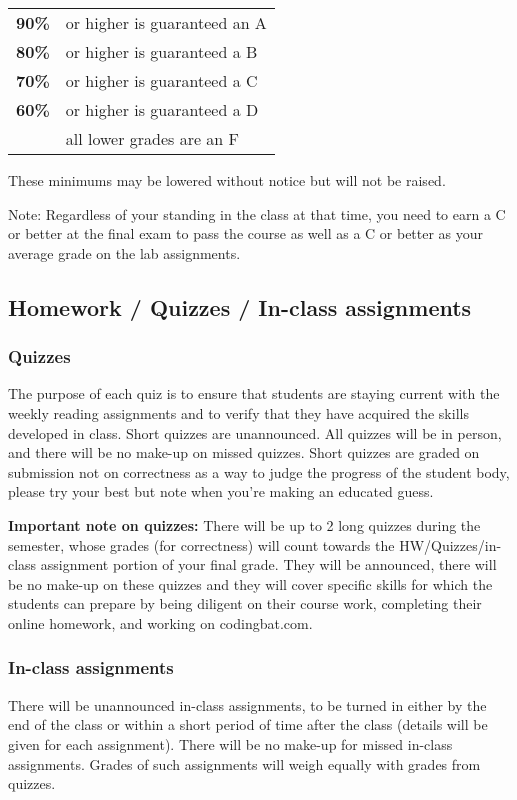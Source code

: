 \documentclass[12pt]{scrartcl}
\begin{document}
\begin{center}
\begin{tabular}{rl}
\textbf{90\%}& or higher is guaranteed an A \\
\textbf{80\%}& or higher is guaranteed a B \\
\textbf{70\%}& or higher is guaranteed a C \\
\textbf{60\%}& or higher is guaranteed a D \\
\textbf{}& all lower grades are an F 
\end{tabular}
\end{center}
These minimums may be lowered without notice but will not be raised. 

Note: Regardless of your standing in the class at that time, you need to earn a C or better at the final exam to pass the course as well as a C or better as your average grade on the lab assignments. 

\subsection{Homework / Quizzes / In-class assignments}

\subsubsection{Quizzes}
The purpose of each quiz is to ensure that students are staying current with the weekly reading assignments and to verify that they have acquired the skills developed in class. 
Short quizzes are unannounced. 
All quizzes will be in person, 
and there will be no make-up on missed quizzes.
Short quizzes are graded on submission not on correctness as a way to judge the progress of the student body, please try your best but note when you're making an educated guess. 

\textbf{Important note on quizzes:} 
There will be up to 2 long quizzes during the semester, whose grades (for correctness) will count towards the HW/Quizzes/in-class assignment portion of your final grade. 
They will be announced, there will be no make-up on these quizzes and they will cover specific skills for which the students can prepare by being diligent on their course work, completing their online homework, and working on codingbat.com. 


\subsubsection{In-class assignments}
There will be unannounced in-class assignments, to be turned in either by the end of the class or within a short period of time after the class (details will be given for each assignment). 
There will be no make-up for missed in-class assignments. 
Grades of such assignments will weigh equally with grades from quizzes. 
\end{document}
